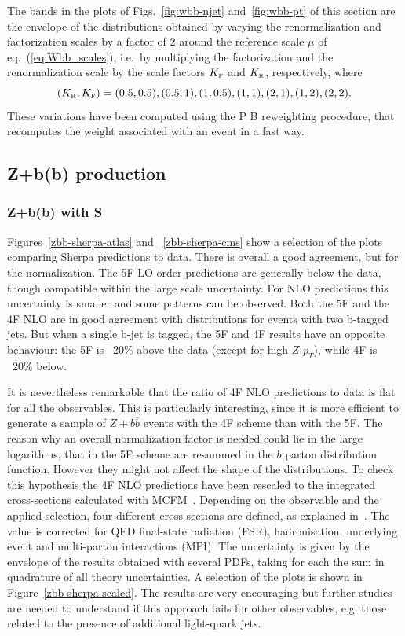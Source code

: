 \documentclass[11pt]{cernrep}
\newcommand{\Sherpa}{S\protect\scalebox{0.8}{HERPA}\xspace}
\newcommand{\pt}{\ensuremath{p_{T}}\xspace}
\newcommand\KRA{K_{\scriptscriptstyle \rm R}}
\newcommand\KFA{K_{\scriptscriptstyle \rm F}}
\newcommand{\POWHEGBOX}{P\protect\scalebox{0.8}{OWHEG} B\protect\scalebox{0.8}{OX}\xspace}
\begin{document}
\begin{enumerate}
The bands in the plots of Figs.~\ref{fig:wbb-njet}
and~\ref{fig:wbb-pt} of this section are the envelope of the
distributions obtained by varying the renormalization and factorization
scales by a factor of 2 around the reference scale $\mu$ of
eq.~(\ref{eq:Wbb_scales}), i.e.~by multiplying the factorization and the
renormalization scale by the scale factors $\KFA$ and $\KRA$, respectively,
where
\begin{equation}
\label{eq:KRA_KFA}
(\KRA,\KFA)=(0.5,0.5),  (0.5,1), (1,0.5), (1,1),(2,1),(1,2),(2,2).
\end{equation}
These variations have been computed using the \POWHEGBOX{} reweighting
procedure, that recomputes the weight associated with an event in a fast way.
\end{enumerate}

\subsection{Z+b(b) production \label{Zbb}}

\subsubsection{Z+b(b) with \Sherpa}

Figures~\ref{zbb-sherpa-atlas} and ~\ref{zbb-sherpa-cms} show a selection of
the plots comparing Sherpa predictions to data.  There is overall a good
agreement, but for the normalization. The 5F LO order predictions are
generally below the data, though compatible within the large scale
uncertainty. For NLO predictions this uncertainty is smaller and some
patterns can be observed. Both the 5F and the 4F NLO are in good agreement
with distributions for events with two b-tagged jets.  But when a single
b-jet is tagged, the 5F and 4F results have an opposite behaviour: the 5F is
~20\% above the data (except for high $Z$ \pt), while 4F is ~20\% below.

It is nevertheless remarkable that the ratio of 4F NLO predictions to data is
flat for all the observables. This is particularly interesting, since it is
more efficient to generate a sample of $Z+b\bar{b}$ events with the 4F scheme
than with the 5F. The reason why an overall normalization factor is needed
could lie in the large logarithms, that in the 5F scheme are resummed in the
$b$ parton distribution function. However they might not affect the shape of
the distributions. To check this hypothesis the 4F NLO predictions have been
rescaled to the integrated cross-sections calculated with
MCFM~\cite{Campbell:2010ff}. Depending on the observable and the applied
selection, four different cross-sections are defined, as explained
in~\cite{Aad:2014dvb}. The value is corrected for QED final-state
radiation (FSR), hadronisation, underlying event and multi-parton
interactions (MPI). The uncertainty is given by the envelope of
the results obtained with several PDFs, taking for each the sum in quadrature of all theory uncertainties.
A selection of the plots is shown in
Figure~\ref{zbb-sherpa-scaled}. The results are very encouraging but further
studies are needed to understand if this approach fails for other
observables, e.g. those related to the presence of additional light-quark
jets.
\end{document}
